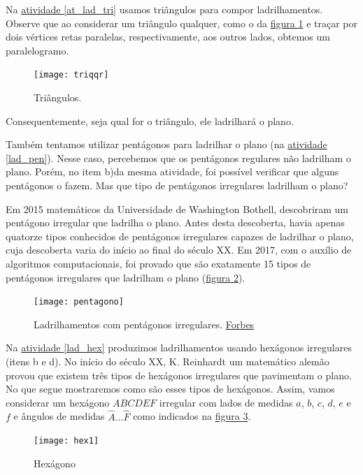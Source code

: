 Na \hyperref[at_lad_tri]{atividade \ref{at_lad_tri}} usamos triângulos para compor ladrilhamentos. Observe que ao considerar um triângulo qualquer, como o da \hyperref[triqqr]{figura \ref{triqqr}} e traçar por dois vértices retas paralelas, respectivamente, aos outros lados, obtemos um paralelogramo. 

\begin{figure}[H]
\centering
\texttt{[image: triqqr]}
\caption{Triângulos.}
\label{triqqr}
\end{figure}

Consequentemente, seja qual for o triângulo, ele ladrilhará o plano.

Também tentamos utilizar pentágonos para ladrilhar o plano (na \hyperref[lad_pen]{atividade \ref{lad_pen}}). Nesse caso, percebemos que os pentágonos regulares não ladrilham o plano. Porém, no item b)da mesma atividade, foi possível verificar  que alguns pentágonos o fazem. Mas que tipo de pentágonos irregulares ladrilham o plano?

Em 2015 matemáticos da  Universidade de Washington Bothell, descobriram um pentágono irregular que ladrilha o plano. Antes desta descoberta, havia apenas quatorze tipos conhecidos de pentágonos irregulares capazes de ladrilhar o  plano, cuja descoberta varia do início ao final do século XX. Em 2017, com o auxílio de algoritmos computacionais, foi provado que são exatamente 15 tipos de pentágonos irregulares que ladrilham o plano (\hyperref[pentagono]{figura \ref{pentagono}}).


\begin{figure}[H]
\centering
\texttt{[image: pentagono]}
\caption{Ladrilhamentos com pentágonos irregulares. \href{encurtador.com.br/dmuE3}{Forbes}}
\label{pentagono}
\end{figure}



Na \hyperref[lad_hex]{atividade \ref{lad_hex}} produzimos ladrilhamentos usando hexágonos irregulares (itens b e d). No início do século XX, K. Reinhardt um matemático alemão provou que existem três tipos de hexágonos irregulares que pavimentam o plano. No que segue mostraremos como são esses tipos de hexágonos. Assim, vamos considerar um hexágono $ABCDEF$ irregular com lados de medidas $a$, $b$, $c$, $d$, $e$ e $f$ e ângulos de medidas $\hat{A}... \hat{F}$ como indicados na \hyperref[hex1]{figura \ref{hex1}}.

\begin{figure}[H]
\centering
\texttt{[image: hex1]}
\caption{Hexágono}
\label{hex1}
\end{figure}

